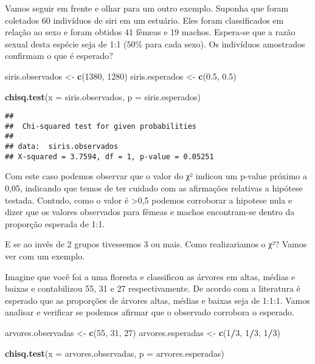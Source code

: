 \documentclass[]{book}
\newenvironment{Shaded}{\begin{snugshade}}{\end{snugshade}}
\newcommand{\DataTypeTok}[1]{\textcolor[rgb]{0.13,0.29,0.53}{#1}}
\newcommand{\DecValTok}[1]{\textcolor[rgb]{0.00,0.00,0.81}{#1}}
\newcommand{\FloatTok}[1]{\textcolor[rgb]{0.00,0.00,0.81}{#1}}
\newcommand{\KeywordTok}[1]{\textcolor[rgb]{0.13,0.29,0.53}{\textbf{#1}}}
\newcommand{\NormalTok}[1]{#1}
\newcommand{\OperatorTok}[1]{\textcolor[rgb]{0.81,0.36,0.00}{\textbf{#1}}}
\newcommand{\StringTok}[1]{\textcolor[rgb]{0.31,0.60,0.02}{#1}}
\begin{document}
Vamos seguir em frente e olhar para um outro exemplo. Suponha que foram coletados 60 indivíduos de siri em um estuário. Eles foram classificados em relação ao sexo e foram obtidos 41 fêmeas e 19 machos. Espera-se que a razão sexual desta espécie seja de 1:1 (50\% para cada sexo). Os indivíduos amostrados confirmam o que é esperado?

\begin{Shaded}
\begin{Highlighting}[]
\NormalTok{siris.observados <-}\StringTok{ }\KeywordTok{c}\NormalTok{(}\DecValTok{1380}\NormalTok{, }\DecValTok{1280}\NormalTok{)}
\NormalTok{siris.esperados <-}\StringTok{ }\KeywordTok{c}\NormalTok{(}\FloatTok{0.5}\NormalTok{, }\FloatTok{0.5}\NormalTok{)}

\KeywordTok{chisq.test}\NormalTok{(}\DataTypeTok{x =}\NormalTok{ siris.observados, }\DataTypeTok{p =}\NormalTok{ siris.esperados)}
\end{Highlighting}
\end{Shaded}

\begin{verbatim}
## 
##  Chi-squared test for given probabilities
## 
## data:  siris.observados
## X-squared = 3.7594, df = 1, p-value = 0.05251
\end{verbatim}

Com este caso podemos observar que o valor do χ² indicou um p-value próximo a 0,05, indicando que temos de ter cuidado com as afirmações relativas a hipótese testada. Contudo, como o valor é \textgreater{}0,5 podemos corroborar a hipotese nula e dizer que os valores observados para fêmeas e machos encontram-se dentro da proporção esperada de 1:1.

E se ao invês de 2 grupos tivessemos 3 ou mais. Como realizariamos o χ²? Vamos ver com um exemplo.

Imagine que você foi a uma floresta e classificou as árvores em altas, médias e baixas e contabilizou 55, 31 e 27 respectivamente. De acordo com a literatura é esperado que as proporções de árvores altas, médias e baixas seja de 1:1:1. Vamos analisar e verificar se podemos afirmar que o observado corrobora o esperado.

\begin{Shaded}
\begin{Highlighting}[]
\NormalTok{arvores.observadas <-}\StringTok{ }\KeywordTok{c}\NormalTok{(}\DecValTok{55}\NormalTok{, }\DecValTok{31}\NormalTok{, }\DecValTok{27}\NormalTok{)}
\NormalTok{arvores.esperadas <-}\StringTok{ }\KeywordTok{c}\NormalTok{(}\DecValTok{1}\OperatorTok{/}\DecValTok{3}\NormalTok{, }\DecValTok{1}\OperatorTok{/}\DecValTok{3}\NormalTok{, }\DecValTok{1}\OperatorTok{/}\DecValTok{3}\NormalTok{)}

\KeywordTok{chisq.test}\NormalTok{(}\DataTypeTok{x =}\NormalTok{ arvores.observadas, }\DataTypeTok{p =}\NormalTok{ arvores.esperadas)}
\end{Highlighting}
\end{Shaded}
\end{document}
